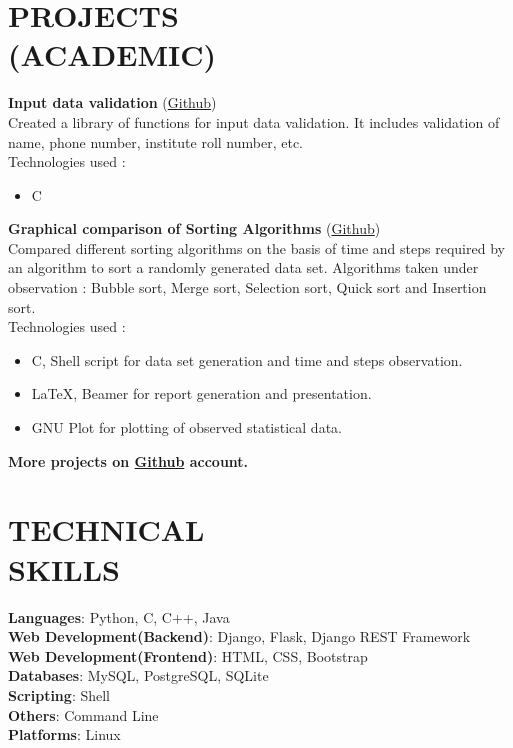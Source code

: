 \documentclass[margin]{res}
\begin{document}
\begin{resume}
\section{PROJECTS\\(ACADEMIC)}
{\textbf{Input data validation}} (\href{https://github.com/gauravkulkarni96/data-validation}{Github})\\
    Created a library of functions for input data validation. It includes validation of name, phone number, institute roll number, etc.\\
Technologies used :
    \begin{itemize} \itemsep -2pt
     \item C
     \end{itemize}
\newpage
   {\textbf{Graphical comparison of Sorting Algorithms}} (\href{https://github.com/gauravkulkarni96/compare-sorting-algorithms}{Github})\\
    Compared different sorting algorithms on the basis of time and steps required by an algorithm to sort a randomly generated data set. Algorithms taken under observation : Bubble sort, Merge sort, Selection sort, Quick sort and Insertion sort.\\
Technologies used :
    \begin{itemize} \itemsep -2pt
     \item C, Shell script for data set generation and time and steps observation.
     \item \LaTeX, Beamer for report generation and presentation.
     \item GNU Plot for plotting of observed statistical data.
     \end{itemize}
 \textbf{More projects on \href{https://github.com/gauravkulkarni96}{Github} account.}


\section{TECHNICAL \\ SKILLS} {\textbf{Languages}:} Python, C, C++, Java\\
	{\textbf{Web Development(Backend)}:} Django, Flask, Django REST Framework\\
    {\textbf{Web Development(Frontend)}:} HTML, CSS, Bootstrap\\
    {\textbf{Databases}:} MySQL, PostgreSQL, SQLite\\
    {\textbf{Scripting}:} Shell\\
    {\textbf{Others}:} Command Line\\
    {\textbf{Platforms}:} Linux




\end{resume}
\end{document}
